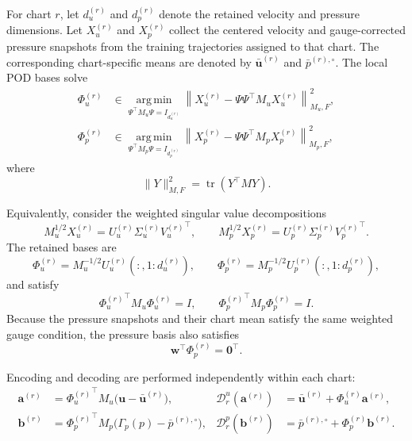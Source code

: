 For chart $r$, let $d_u^{(r)}$ and $d_p^{(r)}$ denote the retained velocity
and pressure dimensions.
Let $X_u^{(r)}$ and $X_p^{(r)}$ collect the centered velocity and
gauge-corrected pressure snapshots from the training trajectories assigned
to that chart.
The corresponding chart-specific means are denoted by
$\bar{\bm u}^{(r)}$ and $\bar p^{(r),\circ}$.
The local POD bases solve
\begin{align}
    \Phi_u^{(r)}
    &\in
    \underset{\Psi^\top M_u\Psi=I_{d_u^{(r)}}}
    {\operatorname{arg\,min}}
    \left\|
        X_u^{(r)}
        -\Psi\Psi^\top M_uX_u^{(r)}
    \right\|_{M_u,F}^2,
    \\
    \Phi_p^{(r)}
    &\in
    \underset{\Psi^\top M_p\Psi=I_{d_p^{(r)}}}
    {\operatorname{arg\,min}}
    \left\|
        X_p^{(r)}
        -\Psi\Psi^\top M_pX_p^{(r)}
    \right\|_{M_p,F}^2,
    \label{eq:app_pod_optimization}
\end{align}
where
\begin{equation}
    \|Y\|_{M,F}^2=\operatorname{tr}(Y^\top MY).
\end{equation}

Equivalently, consider the weighted singular value decompositions
\begin{equation}
    M_u^{1/2}X_u^{(r)}
    =
    U_u^{(r)}\Sigma_u^{(r)}{V_u^{(r)}}^\top,
    \qquad
    M_p^{1/2}X_p^{(r)}
    =
    U_p^{(r)}\Sigma_p^{(r)}{V_p^{(r)}}^\top.
\end{equation}
The retained bases are
\begin{equation}
    \Phi_u^{(r)}
    =
    M_u^{-1/2}
    U_u^{(r)}(:,1{:}d_u^{(r)}),
    \qquad
    \Phi_p^{(r)}
    =
    M_p^{-1/2}
    U_p^{(r)}(:,1{:}d_p^{(r)}),
    \label{eq:app_weighted_svd_bases}
\end{equation}
and satisfy
\begin{equation}
    {\Phi_u^{(r)}}^\top M_u\Phi_u^{(r)}=I,
    \qquad
    {\Phi_p^{(r)}}^\top M_p\Phi_p^{(r)}=I.
\end{equation}
Because the pressure snapshots and their chart mean satisfy the same weighted
gauge condition, the pressure basis also satisfies
\begin{equation}
    \bm w^\top\Phi_p^{(r)}=\bm 0^\top .
\end{equation}

Encoding and decoding are performed independently within each chart:
\begin{align}
    \bm a^{(r)}
    &=
    {\Phi_u^{(r)}}^\top
    M_u
    \bigl(\bm u-\bar{\bm u}^{(r)}\bigr),
    &
    \mathcal D_r^u(\bm a^{(r)})
    &=
    \bar{\bm u}^{(r)}
    +\Phi_u^{(r)}\bm a^{(r)},
    \\
    \bm b^{(r)}
    &=
    {\Phi_p^{(r)}}^\top
    M_p
    \bigl(\Gamma_p(p)-\bar p^{(r),\circ}\bigr),
    &
    \mathcal D_r^p(\bm b^{(r)})
    &=
    \bar p^{(r),\circ}
    +\Phi_p^{(r)}\bm b^{(r)}.
    \label{eq:app_encode_decode}
\end{align}

